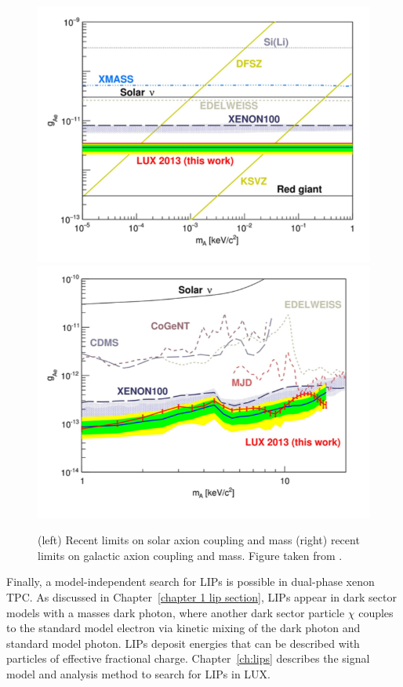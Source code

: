\begin{figure}[htbp]
\begin{center}
\includegraphics[width=\halffig]{figures/lxetpcs/axions1.png}
\includegraphics[width=\halffig]{figures/lxetpcs/axions2.png}
\caption{(left) Recent limits on solar axion coupling and mass (right) recent limits on galactic axion coupling and mass. Figure taken from \cite{LUXAxions}. }
\label{fig:axions}
\end{center}
\end{figure}

Finally, a model-independent search for \ac{LIP}s is possible in dual-phase xenon \ac{TPC}. As discussed in Chapter~\ref{chapter 1 lip section}, \ac{LIP}s appear in dark sector models with a masses dark photon, where another dark sector particle $\chi$ couples to the standard model electron via kinetic mixing of the dark photon and standard model photon. \ac{LIP}s deposit energies that can be described with particles of effective fractional charge. Chapter~\ref{ch:lips} describes the signal model and analysis method to search for \ac{LIP}s in \ac{LUX}. 






